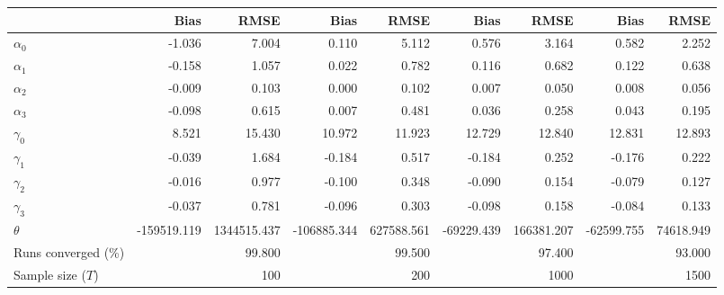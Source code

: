 
\begin{tabular}[t]{lrrrrrrrr}
\toprule
  & Bias & RMSE & Bias & RMSE & Bias & RMSE & Bias & RMSE\\
\midrule
$\alpha_{0}$ & -1.036 & 7.004 & 0.110 & 5.112 & 0.576 & 3.164 & 0.582 & 2.252\\
$\alpha_{1}$ & -0.158 & 1.057 & 0.022 & 0.782 & 0.116 & 0.682 & 0.122 & 0.638\\
$\alpha_{2}$ & -0.009 & 0.103 & 0.000 & 0.102 & 0.007 & 0.050 & 0.008 & 0.056\\
$\alpha_{3}$ & -0.098 & 0.615 & 0.007 & 0.481 & 0.036 & 0.258 & 0.043 & 0.195\\
$\gamma_{0}$ & 8.521 & 15.430 & 10.972 & 11.923 & 12.729 & 12.840 & 12.831 & 12.893\\
$\gamma_{1}$ & -0.039 & 1.684 & -0.184 & 0.517 & -0.184 & 0.252 & -0.176 & 0.222\\
$\gamma_{2}$ & -0.016 & 0.977 & -0.100 & 0.348 & -0.090 & 0.154 & -0.079 & 0.127\\
$\gamma_{3}$ & -0.037 & 0.781 & -0.096 & 0.303 & -0.098 & 0.158 & -0.084 & 0.133\\
$\theta$ & -159519.119 & 1344515.437 & -106885.344 & 627588.561 & -69229.439 & 166381.207 & -62599.755 & 74618.949\\
Runs converged (\%) &  & 99.800 &  & 99.500 &  & 97.400 &  & 93.000\\
Sample size ($T$) &  & 100 &  & 200 &  & 1000 &  & 1500\\
\bottomrule
\end{tabular}
